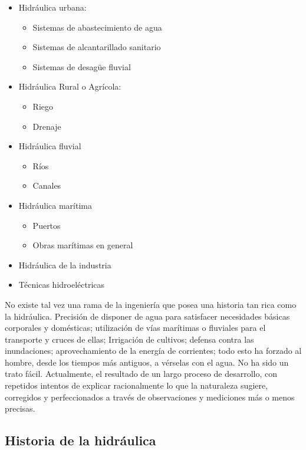 \begin{itemize}
    \item Hidráulica urbana: 
    \begin{itemize}
        \item Sistemas de abastecimiento de agua
        \item Sistemas de alcantarillado sanitario
        \item Sistemas de desagüe fluvial 
    \end{itemize}
    \item Hidráulica Rural o Agrícola: 
    \begin{itemize}
        \item Riego 
        \item Drenaje
    \end{itemize}
    \item Hidráulica fluvial 
    \begin{itemize}
        \item Ríos
        \item Canales
    \end{itemize}
    \item Hidráulica marítima 
    \begin{itemize}
        \item Puertos
        \item Obras marítimas en general 
    \end{itemize}
    \item Hidráulica de la industria
    \item Técnicas hidroeléctricas
\end{itemize}

No existe tal vez una rama de la ingeniería que posea una historia tan rica como la hidráulica. Precisión de disponer de agua para satisfacer necesidades básicas corporales y domésticas; utilización de vías marítimas o fluviales para el transporte y cruces de ellas; Irrigación de cultivos; defensa contra las inundaciones; aprovechamiento de la energía de corrientes; todo esto ha forzado al hombre, desde los tiempos más antiguos, a vérselas con el agua. No ha sido un trato fácil.
Actualmente, el resultado de un largo proceso de desarrollo, con repetidos intentos de explicar racionalmente lo que la naturaleza sugiere, corregidos y perfeccionados a través de observaciones y mediciones más o menos precisas. 

\subsection{Historia de la hidráulica}

